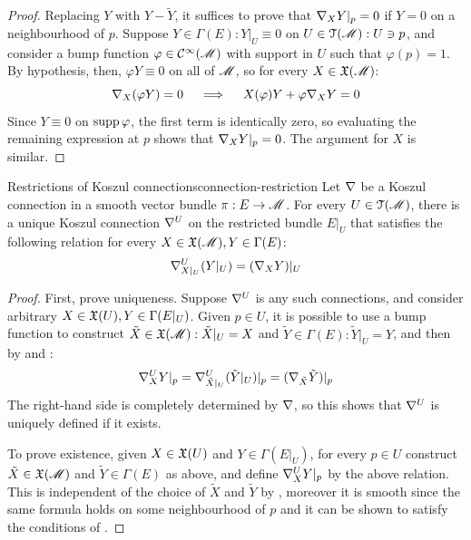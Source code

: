 \begin{proofbox}
  \begin{proof}
    Replacing $ Y $ with $ Y - \tilde{Y} $, it suffices to prove that $ \nabla_X Y \vert_p = 0 $ if $ Y = 0 $ on a neighbourhood of $ p $. Suppose $ Y \in \Gamma(E) : Y \vert_U \equiv 0 $ on $ U \in \EuScript{T}(\mathscr{M}) : U \ni p $, and consider a bump function $ \varphi \in \mathcal{C}^{\infty}(\mathscr{M}) $ with support in $ U $ such that $ \varphi(p) = 1 $. By hypothesis, then, $ \varphi Y \equiv 0 $ on all of $ \mathscr{M} $, so for every $ X \in \mathfrak{X}(\mathscr{M}) $:
    \begin{equation*}
      \nabla_X (\varphi Y) = 0
      \quad \implies \quad
      X(\varphi) Y + \varphi \nabla_X Y = 0
    \end{equation*}
    Since $ Y \equiv 0 $ on $ \operatorname{supp} \varphi $, the first term is identically zero, so evaluating the remaining expression at $ p $ shows that $ \nabla_X Y \vert_p = 0 $. The argument for $ X $ is similar.
  \end{proof}
\end{proofbox}

\begin{proposition}{Restrictions of Koszul connections}{connection-restriction}
  Let $ \nabla $ be a Koszul connection in a smooth vector bundle $ \pi : E \rightarrow \mathscr{M} $. For every $ U \in \EuScript{T}(\mathscr{M}) $, there is a unique Koszul connection $ \nabla^U $ on the restricted bundle $ E \vert_U $ that satisfies the following relation for every $ X \in \mathfrak{X}(\mathscr{M}) , Y \in \Gamma(E) $:
  \begin{equation}
    \nabla^U_{X\vert_U} (Y \vert_U) = (\nabla_X Y) \vert_U
    \label{eq:connection-restriction}
  \end{equation}
\end{proposition}

\begin{proofbox}
  \begin{proof}
    First, prove uniqueness. Suppose $ \nabla^U $ is any such connections, and consider arbitrary $ X \in \mathfrak{X}(U) , Y \in \Gamma(E \vert_U) $. Given $ p \in U $, it is possible to use a bump function to construct $ \tilde{X} \in \mathfrak{X}(\mathscr{M}) : \tilde{X} \vert_U = X $ and $ \tilde{Y} \in \Gamma(E) : \tilde{Y} \vert_U = Y $, and then by  and :
    \begin{equation*}
      \nabla_X^U Y \vert_p = \nabla^U_{\tilde{X} \vert_U} (\tilde{Y} \vert_U) \vert_p = (\nabla_{\tilde{X}} \tilde{Y}) \vert_p
    \end{equation*}
    The right-hand side is completely determined by $ \nabla $, so this shows that $ \nabla^U $ is uniquely defined if it exists.

    To prove existence, given $ X \in \mathfrak{X}(U) $ and $ Y \in \Gamma(E \vert_U) $, for every $ p \in U $ construct $ \tilde{X} \in \mathfrak{X}(\mathscr{M}) $ and $ \tilde{Y} \in \Gamma(E) $ as above, and define $ \nabla_X^U Y \vert_p $ by the above relation. This is independent of the choice of $ \tilde{X} $ and $ \tilde{Y} $ by , moreover it is smooth since the same formula holds on some neighbourhood of $ p $ and it can be shown to satisfy the conditions of .
  \end{proof}
\end{proofbox}

